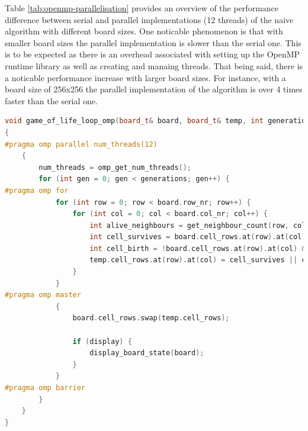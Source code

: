 \documentclass[a4paper,english,12pt,twoside=false]{scrartcl} %
\begin{document}
Table \ref{tab:openmp-parallelisation} provides an overview of the performance difference between serial and parallel implementations (12 threads) of the naive algorithm with different board sizes. One noticable phenomenon is that with smaller board sizes the parallel implementation is slower than the serial one. This is to be expected as there is an overhead associated with setting up the OpenMP runtime library as well as creating and manaing threads. That being said, there is a noticable performance increase with larger board sizes. For instance, with a board size of 256x256 the parallel implementation of the algorithm is over 4 times faster than the serial one. \breakln

\begin{lstlisting}[caption={Parallel Naive State Generation Algorithm},label={lst:gol-parallel-naive-generation-algorithm},language=C++]
void game_of_life_loop_omp(board_t& board, board_t& temp, int generations, int display)
{
#pragma omp parallel num_threads(12)
    {
        num_threads = omp_get_num_threads();
        for (int gen = 0; gen < generations; gen++) {
#pragma omp for
            for (int row = 0; row < board.row_nr; row++) {
                for (int col = 0; col < board.col_nr; col++) {
                    int alive_neighbours = get_neighbour_count(row, col, board);
                    int cell_survives = board.cell_rows.at(row).at(col) && (alive_neighbours == 2 || alive_neighbours == 3);
                    int cell_birth = !board.cell_rows.at(row).at(col) && (alive_neighbours == 3);
                    temp.cell_rows.at(row).at(col) = cell_survives || cell_birth;
                }
            }
#pragma omp master
            {
                board.cell_rows.swap(temp.cell_rows);

                if (display) {
                    display_board_state(board);
                }
            }
#pragma omp barrier
        }
    }
}
\end{lstlisting}
\end{document}

